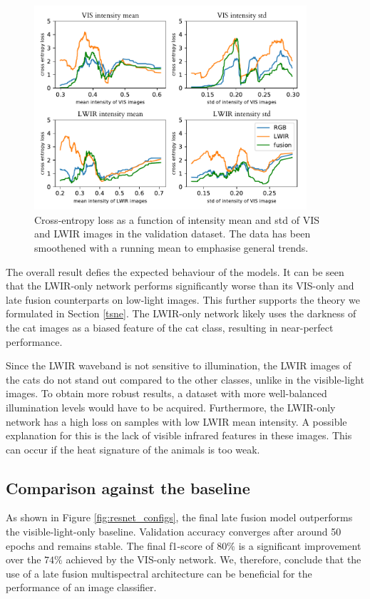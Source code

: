 \documentclass{l4proj}
\begin{document}
\begin{figure}[ht]
  \centering
  \includegraphics[width=0.9\textwidth]{images/evaluation/illumination}
  \caption{Cross-entropy loss as a function of intensity mean and std of VIS and LWIR images in the validation dataset. The data has been smoothened with a running mean to emphasise general trends.}
  \label{fig:illumination}
\end{figure}

The overall result defies the expected behaviour of the models. It can be seen that the LWIR-only network performs significantly worse than its VIS-only and late fusion counterparts on low-light images. This further supports the theory we formulated in Section \ref{tsne}. The LWIR-only network likely uses the darkness of the cat images as a biased feature of the cat class, resulting in near-perfect performance.

Since the LWIR waveband is not sensitive to illumination, the LWIR images of the cats do not stand out compared to the other classes, unlike in the visible-light images. To obtain more robust results, a dataset with more well-balanced illumination levels would have to be acquired. Furthermore, the LWIR-only network has a high loss on samples with low LWIR mean intensity. A possible explanation for this is the lack of visible infrared features in these images. This can occur if the heat signature of the animals is too weak. 

\subsection{Comparison against the baseline}

As shown in Figure \ref{fig:resnet_configs}, the final late fusion model outperforms the visible-light-only baseline. Validation accuracy converges after around 50 epochs and remains stable. The final f1-score of $80\%$ is a significant improvement over the $74\%$ achieved by the VIS-only network. We, therefore, conclude that the use of a late fusion multispectral architecture can be beneficial for the performance of an image classifier.
\end{document}
